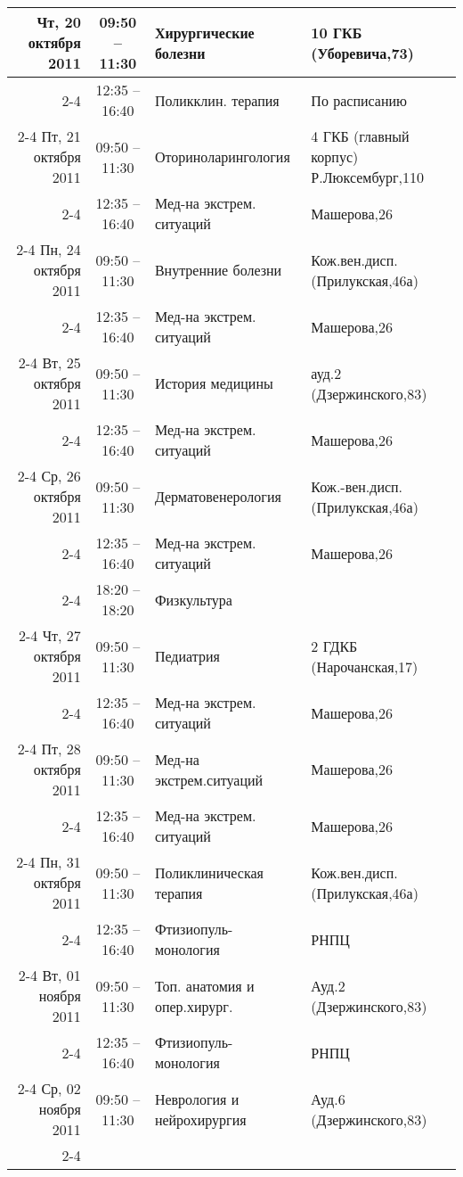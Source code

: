 \documentclass[a4paper,10pt,notitlepage]{report}
\begin{document}
\begin{center}
{\begin{longtable}{r|c|l|l|}
\hline Чт, 20 октября 2011
  & 09:50 -- 11:30 & Хирургические болезни & 10 ГКБ (Уборевича,73) \\ \cline{2-4}
  & 12:35 -- 16:40 & Поликклин. терапия & По расписанию \\ \cline{2-4}
\hline Пт, 21 октября 2011
  & 09:50 -- 11:30 & Оториноларингология & 4 ГКБ (главный корпус) Р.Люксембург,110 \\ \cline{2-4}
  & 12:35 -- 16:40 & Мед-на экстрем. ситуаций & Машерова,26 \\ \cline{2-4}
\hline Пн, 24 октября 2011
  & 09:50 -- 11:30 & Внутренние болезни & Кож.вен.дисп.(Прилукская,46а) \\ \cline{2-4}
  & 12:35 -- 16:40 & Мед-на экстрем. ситуаций & Машерова,26 \\ \cline{2-4}
\hline Вт, 25 октября 2011
  & 09:50 -- 11:30 & История медицины & ауд.2 (Дзержинского,83) \\ \cline{2-4}
  & 12:35 -- 16:40 & Мед-на экстрем. ситуаций & Машерова,26 \\ \cline{2-4}
\hline Ср, 26 октября 2011
  & 09:50 -- 11:30 & Дерматовенерология & Кож.-вен.дисп.(Прилукская,46а) \\ \cline{2-4}
  & 12:35 -- 16:40 & Мед-на экстрем. ситуаций & Машерова,26 \\ \cline{2-4}
  & 18:20 -- 18:20 & Физкультура &  \\ \cline{2-4}
\hline Чт, 27 октября 2011
  & 09:50 -- 11:30 & Педиатрия & 2 ГДКБ (Нарочанская,17) \\ \cline{2-4}
  & 12:35 -- 16:40 & Мед-на экстрем. ситуаций & Машерова,26 \\ \cline{2-4}
\hline Пт, 28 октября 2011
  & 09:50 -- 11:30 & Мед-на экстрем.ситуаций & Машерова,26 \\ \cline{2-4}
  & 12:35 -- 16:40 & Мед-на экстрем. ситуаций & Машерова,26 \\ \cline{2-4}
\hline Пн, 31 октября 2011
  & 09:50 -- 11:30 & Поликлиническая терапия & Кож.вен.дисп.(Прилукская,46а) \\ \cline{2-4}
  & 12:35 -- 16:40 & Фтизиопуль- монология & РНПЦ \\ \cline{2-4}
\hline Вт, 01 ноября 2011
  & 09:50 -- 11:30 & Топ. анатомия и опер.хирург. & Ауд.2 (Дзержинского,83) \\ \cline{2-4}
  & 12:35 -- 16:40 & Фтизиопуль- монология & РНПЦ \\ \cline{2-4}
\hline Ср, 02 ноября 2011
  & 09:50 -- 11:30 & Неврология и нейрохирургия & Ауд.6 (Дзержинского,83) \\ \cline{2-4}

\end{longtable}}
\end{center}
\end{document}
